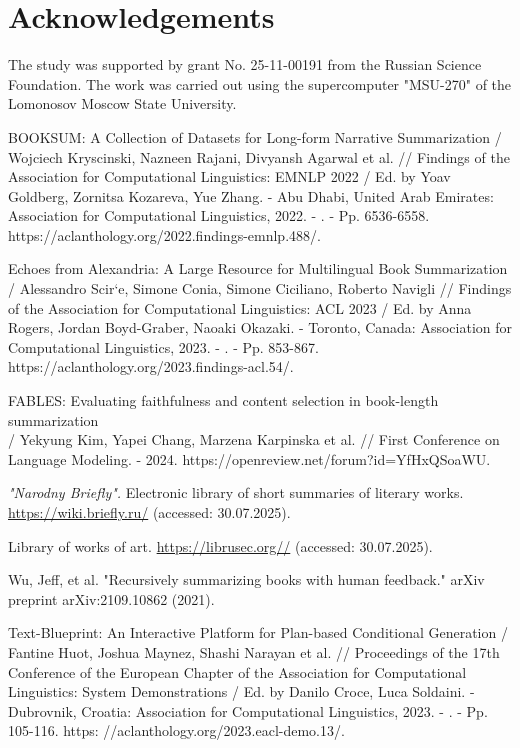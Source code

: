 \documentclass{superfri}
\begin{document}
\section*{Acknowledgements}
The study was supported by grant No. 25-11-00191 from the Russian Science Foundation.
The work was carried out using the supercomputer "MSU-270" of the Lomonosov Moscow State University.



\openaccess


\begin{thebibliography}{99}
BOOKSUM: A Collection of Datasets for Long-form Narrative Summarization / Wojciech Kryscinski, Nazneen Rajani, Divyansh Agarwal et al. // Findings of the Association for Computational Linguistics: EMNLP 2022 / Ed. by Yoav Goldberg, Zornitsa Kozareva, Yue Zhang. - Abu Dhabi, United Arab Emirates: Association for Computational Linguistics, 2022. - . - Pp. 6536-6558. https://aclanthology.org/2022.findings-emnlp.488/.

Echoes from Alexandria: A Large Resource for Multilingual Book Summarization / Alessandro Scir`e, Simone Conia, Simone Ciciliano, Roberto Navigli // Findings of the Association for Computational Linguistics: ACL 2023 / Ed. by Anna Rogers, Jordan Boyd-Graber, Naoaki Okazaki. - Toronto, Canada: Association for Computational Linguistics, 2023. - . - Pp. 853-867. https://aclanthology.org/2023.findings-acl.54/.

FABLES: Evaluating faithfulness and content selection in book-length summarization \\/ Yekyung Kim, Yapei Chang, Marzena Karpinska et al. // First Conference on Language Modeling. - 2024. https://openreview.net/forum?id=YfHxQSoaWU.

\textit{"Narodny Briefly".}  
Electronic library of short summaries of literary works.
\url{https://wiki.briefly.ru/} (accessed: 30.07.2025).

Library of works of art.
\url{https://librusec.org//} (accessed: 30.07.2025).

Wu, Jeff, et al. "Recursively summarizing books with human feedback." arXiv preprint arXiv:2109.10862 (2021).

Text-Blueprint: An Interactive Platform for Plan-based Conditional Generation / Fantine Huot, Joshua Maynez, Shashi Narayan et al. // Proceedings of the 17th Conference of the European Chapter of the Association for Computational Linguistics:
System Demonstrations / Ed. by Danilo Croce, Luca Soldaini. - Dubrovnik, Croatia: Association for Computational Linguistics, 2023. - . - Pp. 105-116. https:
//aclanthology.org/2023.eacl-demo.13/.


\end{thebibliography}
\end{document}
